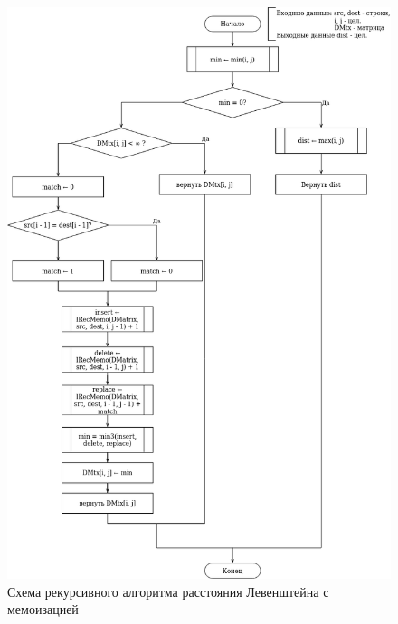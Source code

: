 \begin{figure}[h!]
	\begin{center}
		\includegraphics[scale=0.6]{assets/leven-matrix-memo.png}
	\end{center}
	
	\caption{Схема рекурсивного алгоритма расстояния Левенштейна с мемоизацией}
	\label{fig:l-recur-matrix}
\end{figure}

